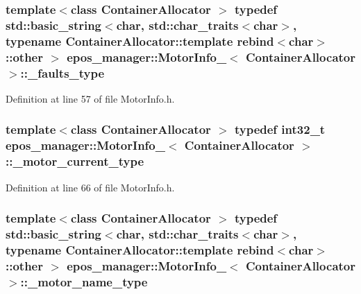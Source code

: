 \subsubsection[{\-\_\-faults\-\_\-type}]{\setlength{\rightskip}{0pt plus 5cm}template$<$class Container\-Allocator $>$ typedef std\-::basic\-\_\-string$<$char, std\-::char\-\_\-traits$<$char$>$, typename \-Container\-Allocator\-::template rebind$<$char$>$\-::other $>$ {\bf epos\-\_\-manager\-::\-Motor\-Info\-\_\-}$<$ \-Container\-Allocator $>$\-::{\bf \-\_\-faults\-\_\-type}}\label{structepos__manager_1_1MotorInfo___a00878aead7a39942d9bd39f889589e31}


\-Definition at line 57 of file \-Motor\-Info.\-h.

\subsubsection[{\-\_\-motor\-\_\-current\-\_\-type}]{\setlength{\rightskip}{0pt plus 5cm}template$<$class Container\-Allocator $>$ typedef int32\-\_\-t {\bf epos\-\_\-manager\-::\-Motor\-Info\-\_\-}$<$ \-Container\-Allocator $>$\-::{\bf \-\_\-motor\-\_\-current\-\_\-type}}\label{structepos__manager_1_1MotorInfo___ae6ba080b21c6212171fade4cfc045c67}


\-Definition at line 66 of file \-Motor\-Info.\-h.

\subsubsection[{\-\_\-motor\-\_\-name\-\_\-type}]{\setlength{\rightskip}{0pt plus 5cm}template$<$class Container\-Allocator $>$ typedef std\-::basic\-\_\-string$<$char, std\-::char\-\_\-traits$<$char$>$, typename \-Container\-Allocator\-::template rebind$<$char$>$\-::other $>$ {\bf epos\-\_\-manager\-::\-Motor\-Info\-\_\-}$<$ \-Container\-Allocator $>$\-::{\bf \-\_\-motor\-\_\-name\-\_\-type}}\label{structepos__manager_1_1MotorInfo___acc37a7d154008e1eee9c1de1ca344b88}


